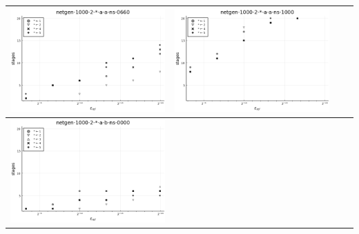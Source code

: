 \documentclass{article}
\begin{document}
\begin{landscape}
\begin{center}
\begin{longtable}{| c | c | c | c |}
\includegraphics[height=0.22\textheight]{hiter_fixlim_netgen-1000-2-_-a-a-ns-0660.png} &
\includegraphics[height=0.22\textheight]{hiter_fixlim_netgen-1000-2-_-a-a-ns-1000.png} \\
                \hline
\includegraphics[height=0.22\textheight]{hiter_fixlim_netgen-1000-2-_-a-b-ns-0000.png} &

\end{longtable}
\end{center}
\end{landscape}
\end{document}
